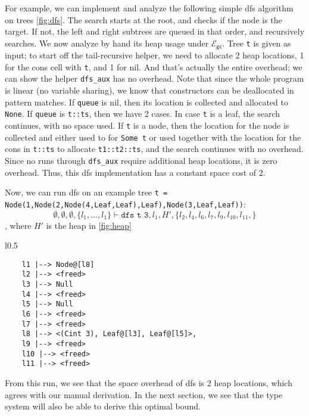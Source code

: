 \documentclass{easychair}
\newcommand{\ms}[1]{\ensuremath{\mathsf{#1}}}
\newcommand{\gcSem}{\ensuremath{\mathcal{E}_{\ms{gc}}}}
\theoremstyle{definition}
\begin{document}
For example, we can implement and analyze the following simple dfs algorithm on trees 
\ref{fig:dfs}.
The search starts at the root, and checks if the node is the target. If not, 
the left and right subtrees are queued in that order, and recursively searches.
We now analyze by hand its heap usage under \gcSem. Tree \texttt{t} is given 
as input; to start off the tail-recursive helper, we need to allocate 2 heap locations,
1 for the cons cell with \texttt{t}, and 1 for nil. And that's actually the entire overhead; 
we can show the helper \texttt{dfs\_aux} has no overhead. Note that since the whole program is 
linear (no variable sharing), we know that constructors can be deallocated in pattern matches. 
If \texttt{queue} is nil, then its location is collected and allocated to \texttt{None}.
If \texttt{queue} is \texttt{t::ts}, then we have 2 cases. In case \texttt{t} is a leaf, 
the search continues, with no space used. If \texttt{t} is a node, then the location for the node
is collected and either used to for \texttt{Some t} or used together with the location for 
the cons in \texttt{t::ts} to allocate \texttt{t1::t2::ts}, and the search continues with
no overhead. Since no runs through \texttt{dfs\_aux} require additional heap locations, 
it is zero overhead. Thus, this dfs implementation has a constant space cost of 2.

Now, we can run dfs on an example tree 
\texttt{t = Node(1,Node(2,Node(4,Leaf,Leaf),Leaf),Node(3,Leaf,Leaf))}:
\[
\emptyset,\emptyset,\emptyset,\{l_1,...,l_1\} 
	\vdash \texttt{dfs t 3}, l_1, H', 
	\{l_2, l_4, l_6, l_7, l_9, l_10, l_11,\}
\], where $H'$ is the heap in \ref{fig:heap}

\begin{wrapfigure}{l}{0.5\textwidth}
	\vspace{-20pt}
		\begin{center}
\begin{verbatim}
	l1 |--> Node@[l8] 
	l2 |--> <freed>
	l3 |--> Null 
	l4 |--> <freed>
	l5 |--> Null
	l6 |--> <freed>
	l7 |--> <freed>
	l8 |--> <(Cint 3), Leaf@[l3], Leaf@[l5]>, 
	l9 |--> <freed>
	l10 |--> <freed>
	l11 |--> <freed>
\end{verbatim}
		\end{center}
				\vspace{-20pt}
			\caption{$H'$}
		\vspace{-10pt}
\label{fig:heap}
\end{wrapfigure}

From this run, we see that the space overhead of dfs is 2 heap locations, which agrees with 
our manual derivation. In the next section, we see that the type system will also be 
able to derive this optimal bound. 
\end{document}
